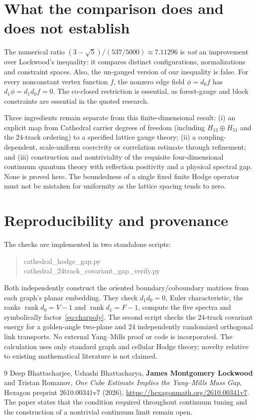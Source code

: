 \documentclass[11pt,a4paper]{article}
\begin{document}
\section{What the comparison does and does not establish}
The numerical ratio $(3-\sqrt5)/(537/5000)\approx7.11296$ is \emph{not} an improvement over Lockwood's inequality: it compares distinct configurations, normalizations and constraint spaces. Also, the un-gauged version of our inequality is false. For every nonconstant vertex function $f$, the nonzero edge field $\phi=d_0f$ has $d_1\phi=d_1d_0f=0$. The co-closed restriction is essential, as forest-gauge and block constraints are essential in the quoted research.

Three ingredients remain separate from this finite-dimensional result: (i) an explicit map from Cathedral carrier degrees of freedom (including $H_{13}\oplus H_{51}$ and the $24$-track ordering) to a specified lattice gauge theory; (ii) a coupling-dependent, scale-uniform coercivity or correlation estimate through refinement; and (iii) construction and nontriviality of the requisite four-dimensional continuum quantum theory with reflection positivity and a physical spectral gap. None is proved here. The boundedness of a single fixed finite Hodge operator must not be mistaken for uniformity as the lattice spacing tends to zero.

\section{Reproducibility and provenance}
The checks are implemented in two standalone scripts:
\begin{quote}\small\ttfamily
cathedral\_hodge\_gap.py\\
cathedral\_24track\_covariant\_gap\_verify.py
\end{quote}
Both independently construct the oriented boundary/coboundary matrices from each graph's planar embedding. They check $d_1d_0=0$, Euler characteristic, the ranks $\operatorname{rank}d_0=V-1$ and $\operatorname{rank}d_1=F-1$, compute the five spectra and symbolically factor~\eqref{eq:charpoly}. The second script checks the 24-track covariant energy for a golden-angle two-plane and 24 independently randomized orthogonal link transports. No external Yang--Mills proof or code is incorporated. The calculation uses only standard graph and cellular Hodge theory; novelty relative to existing mathematical literature is not claimed.

\begin{thebibliography}{9}
 Deep Bhattacharjee, Ushashi Bhattacharya, \textbf{James Montgomery Lockwood} and Tristan Romanov, \emph{One Cube Estimate Implies the Yang--Mills Mass Gap}, Hexagon preprint 2610.00341v7 (2026), \url{https://hexagonmath.org/2610.00341v7}. The paper states that the condition required throughout continuum tuning and the construction of a nontrivial continuum limit remain open.
\end{thebibliography}
\end{document}
